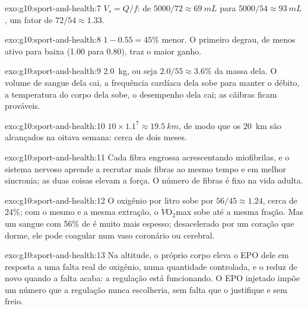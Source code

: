 \begin{solution}{exo:g10:sport-and-health:7}
$V_s = Q/f$: de $5000/72 \approx \qty{69}{mL}$ para $5000/54 \approx
\qty{93}{mL}$, um fator de $72/54 \approx 1.33$.
\end{solution}

\begin{solution}{exo:g10:sport-and-health:8}
$1 - 0.55 = 45\%$ menor. O primeiro degrau, de menos ativo para baixa
(1.00 para 0.80), traz o maior ganho.
\end{solution}

\begin{solution}{exo:g10:sport-and-health:9}
\qty{2.0}{kg}, ou seja $2.0/55 \approx 3.6\%$ da massa dela. O volume de
sangue dela cai, a frequência cardíaca dela sobe para manter o débito, a
temperatura do corpo dela sobe, o desempenho dela cai; as cãibras ficam
prováveis.
\end{solution}

\begin{solution}{exo:g10:sport-and-health:10}
$10 \times 1.1^7 \approx \qty{19.5}{km}$, de modo que os \qty{20}{km}
são alcançados na oitava semana: cerca de dois meses.
\end{solution}

\begin{solution}{exo:g10:sport-and-health:11}
Cada fibra engrossa acrescentando miofibrilas, e o sistema nervoso
aprende a recrutar mais fibras ao mesmo tempo e em melhor sincronia; as
duas coisas elevam a força. O número de fibras é fixo na vida adulta.
\end{solution}

\begin{solution}{exo:g10:sport-and-health:12}
O oxigênio por litro sobe por $56/45 \approx 1.24$, cerca de 24\%; com
o mesmo  e a mesma extração, o
$\dot V\!\mathrm{O_2}$max sobe até a mesma fração. Mas um sangue com
56\% de  é muito mais espesso; desacelerado por um coração que
dorme, ele pode coagular num vaso coronário ou cerebral.
\end{solution}

\begin{solution}{exo:g10:sport-and-health:13}
Na altitude, o próprio corpo eleva o EPO dele em resposta a uma falta
real de oxigênio, numa quantidade controlada, e o reduz de novo quando
a falta acaba: a regulação está funcionando. O EPO injetado impõe um
número que a regulação nunca escolheria, sem falta que o justifique e
sem freio.
\end{solution}

